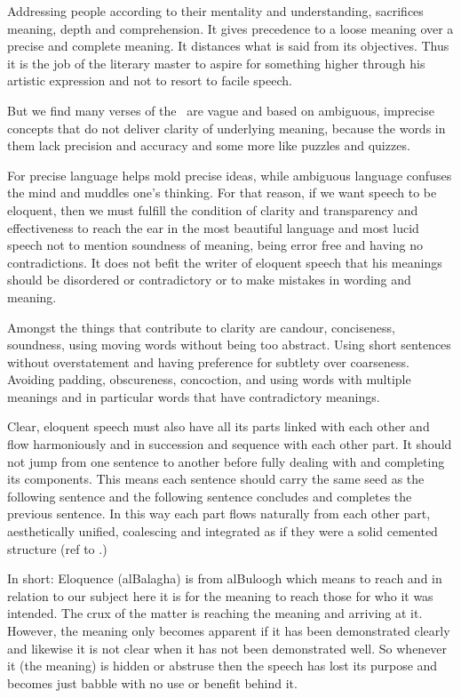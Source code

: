 \documentclass[12pt]{memoir}
\begin{document}
Addressing people according to their mentality and understanding,
sacrifices meaning, depth and comprehension.
It gives precedence to a loose meaning over a precise and complete meaning.
It distances what is said from its objectives.
Thus it is the job of the literary master to aspire for something higher
through his artistic expression and not to resort to facile speech.

But we find many verses of the \Quran\ are vague and based on ambiguous,
imprecise concepts that do not deliver clarity of underlying meaning,
because the words in them lack precision and accuracy
and some more like puzzles and quizzes.

For precise language helps mold precise ideas,
while ambiguous language confuses the mind and muddles one’s thinking.
For that reason, if we want speech to be eloquent,
then we must fulfill the condition of clarity and transparency
and effectiveness to reach the ear in the most beautiful language
and most lucid speech not to mention soundness of meaning,
being error free and having no contradictions.
It does not befit the writer of eloquent speech
that his meanings should be disordered or contradictory
or to make mistakes in wording and meaning.

Amongst the things that contribute to clarity are candour, conciseness,
soundness, using moving words without being too abstract.
Using short sentences without overstatement
and having preference for subtlety over coarseness.
Avoiding padding, obscureness, concoction,
and using words with multiple meanings and in particular words
that have contradictory meanings.

Clear, eloquent speech must also have all its parts linked
with each other and flow harmoniously and in succession
and sequence with each other part.
It should not jump from one sentence to another
before fully dealing with and completing its components.
This means each sentence should carry the same seed as the following sentence
and the following sentence concludes and completes the previous sentence.
In this way each part flows naturally from each other part,
aesthetically unified, coalescing and integrated
as if they were a solid cemented structure (ref to \Quran.)

In short: Eloquence (al\–Balagha) is from al\–Buloogh which means
to reach and in relation to our subject here it is for the meaning
to reach those for who it was intended.
The crux of the matter is reaching the meaning and arriving at it.
However, the meaning only becomes apparent if it has been demonstrated clearly
and likewise it is not clear when it has not been demonstrated well.
So whenever it (the meaning) is hidden or abstruse
then the speech has lost its purpose and becomes just babble
with no use or benefit behind it.
\end{document}
